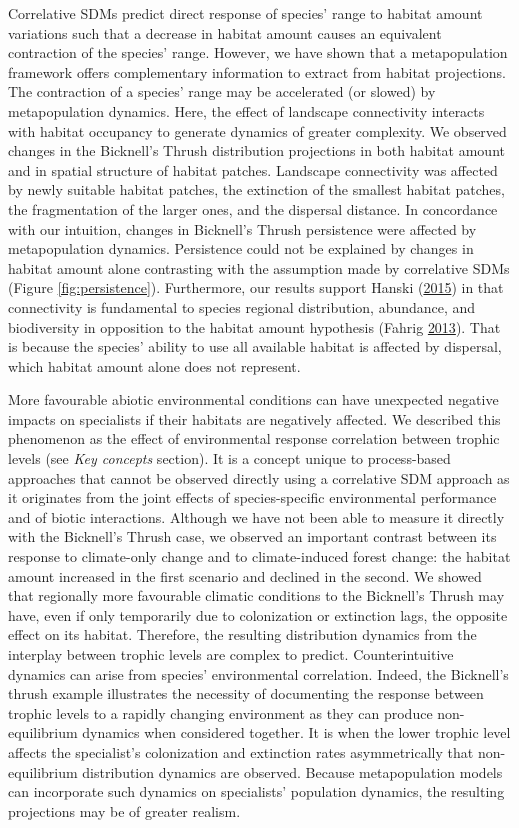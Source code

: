\documentclass[12pt]{article}
\begin{document}
Correlative SDMs predict direct response of species' range to habitat
amount variations such that a decrease in habitat amount causes an
equivalent contraction of the species' range. However, we have shown
that a metapopulation framework offers complementary information to
extract from habitat projections. The contraction of a species' range
may be accelerated (or slowed) by metapopulation dynamics. Here, the
effect of landscape connectivity interacts with habitat occupancy to
generate dynamics of greater complexity. We observed changes in the
Bicknell's Thrush distribution projections in both habitat amount and in
spatial structure of habitat patches. Landscape connectivity was
affected by newly suitable habitat patches, the extinction of the
smallest habitat patches, the fragmentation of the larger ones, and the
dispersal distance. In concordance with our intuition, changes in
Bicknell's Thrush persistence were affected by metapopulation dynamics.
Persistence could not be explained by changes in habitat amount alone
contrasting with the assumption made by correlative SDMs (Figure
\ref{fig:persistence}). Furthermore, our results support Hanski
(\protect\hyperlink{ref-hanski_habitat_2015}{2015}) in that connectivity
is fundamental to species regional distribution, abundance, and
biodiversity in opposition to the habitat amount hypothesis (Fahrig
\protect\hyperlink{ref-fahrig_rethinking_2013}{2013}). That is because
the species' ability to use all available habitat is affected by
dispersal, which habitat amount alone does not represent.

More favourable abiotic environmental conditions can have unexpected
negative impacts on specialists if their habitats are negatively
affected. We described this phenomenon as the effect of environmental
response correlation between trophic levels (see \emph{Key concepts}
section). It is a concept unique to process-based approaches that cannot
be observed directly using a correlative SDM approach as it originates
from the joint effects of species-specific environmental performance and
of biotic interactions. Although we have not been able to measure it
directly with the Bicknell's Thrush case, we observed an important
contrast between its response to climate-only change and to
climate-induced forest change: the habitat amount increased in the first
scenario and declined in the second. We showed that regionally more
favourable climatic conditions to the Bicknell's Thrush may have, even
if only temporarily due to colonization or extinction lags, the opposite
effect on its habitat. Therefore, the resulting distribution dynamics
from the interplay between trophic levels are complex to predict.
Counterintuitive dynamics can arise from species' environmental
correlation. Indeed, the Bicknell's thrush example illustrates the
necessity of documenting the response between trophic levels to a
rapidly changing environment as they can produce non-equilibrium
dynamics when considered together. It is when the lower trophic level
affects the specialist's colonization and extinction rates
asymmetrically that non-equilibrium distribution dynamics are observed.
Because metapopulation models can incorporate such dynamics on
specialists' population dynamics, the resulting projections may be of
greater realism.
\end{document}
